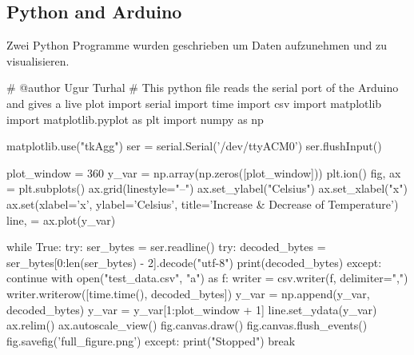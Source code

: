 \documentclass[12pt]{article}
\begin{document}
\subsection{Python and Arduino}
Zwei Python Programme wurden geschrieben um Daten aufzunehmen und zu visualisieren.
\begin{python}[language=Python]
# @author Ugur Turhal
# This python file reads the serial port of the Arduino and gives a live plot
import serial
import time
import csv
import matplotlib
import matplotlib.pyplot as plt
import numpy as np

matplotlib.use("tkAgg")
ser = serial.Serial('/dev/ttyACM0')
ser.flushInput()

plot_window = 360
y_var = np.array(np.zeros([plot_window]))
plt.ion()
fig, ax = plt.subplots()
ax.grid(linestyle="--")
ax.set_ylabel("Celsius")
ax.set_xlabel("x")
ax.set(xlabel='x', ylabel='Celsius',
       title='Increase & Decrease of \n Temperature')
line, = ax.plot(y_var)

while True:
    try:
        ser_bytes = ser.readline()
        try:
            decoded_bytes = ser_bytes[0:len(ser_bytes) - 2].decode("utf-8")
            print(decoded_bytes)
        except:
            continue
        with open("test_data.csv", "a") as f:
            writer = csv.writer(f, delimiter=",")
            writer.writerow([time.time(), decoded_bytes])
        y_var = np.append(y_var, decoded_bytes)
        y_var = y_var[1:plot_window + 1]
        line.set_ydata(y_var)
        ax.relim()
        ax.autoscale_view()
        fig.canvas.draw()
        fig.canvas.flush_events()
        fig.savefig('full_figure.png')
    except:
        print("Stopped")
        break
\end{python}
\newpage
\end{document}
